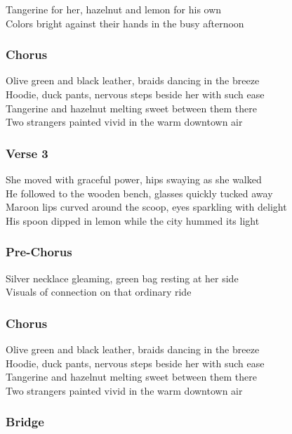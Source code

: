 Tangerine for her, hazelnut and lemon for his own\\
Colors bright against their hands in the busy afternoon

\subsubsection{Chorus}\label{chorus-51}

Olive green and black leather, braids dancing in the breeze\\
Hoodie, duck pants, nervous steps beside her with such ease\\
Tangerine and hazelnut melting sweet between them there\\
Two strangers painted vivid in the warm downtown air

\subsubsection{Verse 3}\label{verse-3-12}

She moved with graceful power, hips swaying as she walked\\
He followed to the wooden bench, glasses quickly tucked away\\
Maroon lips curved around the scoop, eyes sparkling with delight\\
His spoon dipped in lemon while the city hummed its light

\subsubsection{Pre-Chorus}\label{pre-chorus-26}

Silver necklace gleaming, green bag resting at her side\\
Visuals of connection on that ordinary ride

\subsubsection{Chorus}\label{chorus-52}

Olive green and black leather, braids dancing in the breeze\\
Hoodie, duck pants, nervous steps beside her with such ease\\
Tangerine and hazelnut melting sweet between them there\\
Two strangers painted vivid in the warm downtown air

\subsubsection{Bridge}\label{bridge-19}

